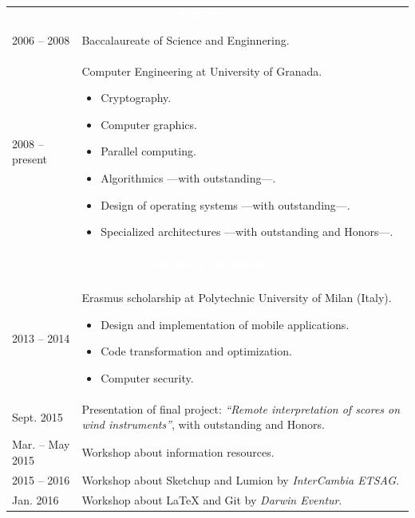 \documentclass[12pt,a4paper]{article}
\newcommand{\header}[1]{\multicolumn{2}{c}{\cellcolor{black} \textcolor{white} {#1}} \\}
\begin{document}
	\begin{tabular}{p{}p{}}
		\\
		\header{\textbf{Education}}
		\\
		2006 -- 2008 & Baccalaureate of Science and Enginnering. \\
		2008 -- present & Computer Engineering at University of Granada.
		\begin{itemize} \itemsep 0pt \parskip 0pt
			\item Cryptography.
			\item Computer graphics.
			\item Parallel computing.
			\item Algorithmics ---with outstanding---.
			\item Design of operating systems ---with outstanding---.
			\item Specialized architectures ---with outstanding and Honors---.
		\end{itemize}
		\\
		\header{\textbf{University experience}}
		\\
		2013 -- 2014 & Erasmus scholarship at Polytechnic University of Milan
		(Italy).
		\begin{itemize} \itemsep 0pt \parskip 0pt
			\item Design and implementation of mobile applications.
			\item Code transformation and optimization.
			\item Computer security.
		\end{itemize} \\
		Sept. 2015 & Presentation of final project: \textit{``Remote 
		interpretation of scores on wind instruments''}, with outstanding and 
		Honors. \\
		Mar. -- May 2015 & Workshop about information resources. \\
		2015 -- 2016 & Workshop about Sketchup and Lumion by \textit{InterCambia 
		ETSAG}. \\
		Jan. 2016 & Workshop about LaTeX and Git by \textit{Darwin Eventur}. \\
		\end{tabular}
		
\end{document}
